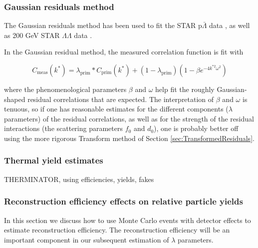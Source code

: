 \subsubsection{Gaussian residuals method}
\label{sec:GaussianResiduals}

The Gaussian residuals method has been used  to fit the STAR p$\bar{\Lambda}$ data \cite{Shapoval:2014yha}, as well as 200 GeV STAR $\Lambda\Lambda$ data \cite{Adamczyk:2014vca}.

In the Gaussian residual method, the measured correlation function is fit with 

\begin{equation}
\label{eq:GaussianResiduals}
C_{\mathrm{meas}}(k^*) = \lambda_{\mathrm{prim}}*C_{\mathrm{prim}}(k^*)+(1-\lambda_{\mathrm{prim}})(1-\beta  e^{-4k^{*2}\omega^2})
\end{equation}

where the phenomenological parameters $\beta$ and $\omega$ help fit the roughly Gaussian-shaped residual correlations that are expected.
The interpretation of $\beta$ and $\omega$ is tenuous, so if one has reasonable estimates for the different components ($\lambda$ parameters) of the residual correlations, as well as for the strength of the residual interactions (the scattering parameters $f_0$ and $d_0$), one is probably better off using the more rigorous Transform method of Section \ref{sec:TransformedResiduals}.






\subsubsection{Thermal yield estimates}
\label{sec:ThermalYields}

THERMINATOR, using efficiencies, yields, fakes






\subsubsection{Reconstruction efficiency effects on relative particle yields}
\label{sec:ReconstructionEff}

In this section we discuss how to use Monte Carlo events with detector effects to estimate reconstruction efficiency.  
The reconstruction efficiency will be an important component in our subsequent estimation of $\lambda$ parameters.


